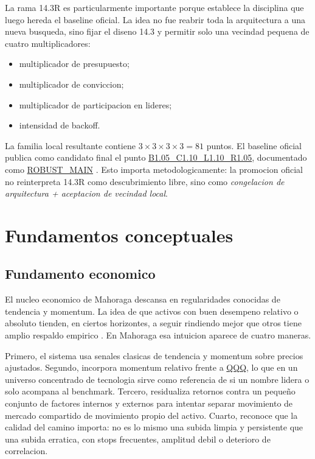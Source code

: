 \documentclass[11pt,letterpaper]{article}
\newcommand{\code}[1]{{\urlstyle{tt}\url{#1}}}
\newcommand{\officialcandidate}{\code{B1.05_C1.10_L1.10_R1.05}}
\begin{document}
La rama 14.3R es particularmente importante porque establece la disciplina que luego hereda el baseline oficial. La idea no fue reabrir toda la arquitectura a una nueva busqueda, sino fijar el diseno 14.3 y permitir solo una vecindad pequena de cuatro multiplicadores:

\begin{itemize}
    \item multiplicador de presupuesto;
    \item multiplicador de conviccion;
    \item multiplicador de participacion en lideres;
    \item intensidad de backoff.
\end{itemize}

La familia local resultante contiene \(3 \times 3 \times 3 \times 3 = 81\) puntos. El baseline oficial publica como candidato final el punto \officialcandidate{}, documentado como \code{ROBUST_MAIN} \citep{quantOfficialAudits2026}. Esto importa metodologicamente: la promocion oficial no reinterpreta 14.3R como descubrimiento libre, sino como \emph{congelacion de arquitectura + aceptacion de vecindad local}.

\section{Fundamentos conceptuales}

\subsection{Fundamento economico}
El nucleo economico de Mahoraga descansa en regularidades conocidas de tendencia y momentum. La idea de que activos con buen desempeno relativo o absoluto tienden, en ciertos horizontes, a seguir rindiendo mejor que otros tiene amplio respaldo empirico \citep{jegadeeshTitman1993,moskowitzOoiPedersen2012,asnessMoskowitzPedersen2013}. En Mahoraga esa intuicion aparece de cuatro maneras.

Primero, el sistema usa senales clasicas de tendencia y momentum sobre precios ajustados. Segundo, incorpora momentum relativo frente a \code{QQQ}, lo que en un universo concentrado de tecnologia sirve como referencia de si un nombre lidera o solo acompana al benchmark. Tercero, residualiza retornos contra un pequeño conjunto de factores internos y externos para intentar separar movimiento de mercado compartido de movimiento propio del activo. Cuarto, reconoce que la calidad del camino importa: no es lo mismo una subida limpia y persistente que una subida erratica, con stops frecuentes, amplitud debil o deterioro de correlacion.
\end{document}
